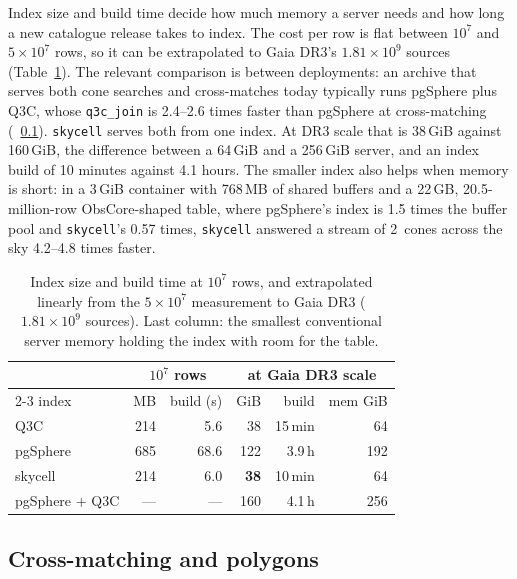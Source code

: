 Index size and build time decide how much memory a server needs and how long a new
catalogue release takes to index. The cost per row is flat between $10^7$ and $5\times10^7$ rows, so it can be
extrapolated to Gaia DR3's $1.81\times10^9$ sources (Table~\ref{tab:gaia}). The
relevant comparison is between deployments: an archive that serves both cone searches
and cross-matches today typically runs pgSphere plus Q3C, whose \texttt{q3c\_join} is
2.4--2.6 times faster than pgSphere at cross-matching (\Sect~\ref{sec:xmatch}).
\texttt{skycell} serves both from one index. At DR3 scale that is 38\,GiB against
160\,GiB, the difference between a 64\,GiB and a 256\,GiB server, and an index build of
10 minutes against 4.1 hours. The smaller index also helps when memory is short: in a
3\,GiB container with 768\,MB of shared buffers and a 22\,GB, 20.5-million-row
ObsCore-shaped table, where pgSphere's index is 1.5 times the buffer pool and
\texttt{skycell}'s 0.57 times, \texttt{skycell} answered a stream of 2\degr\ cones
across the sky 4.2--4.8 times faster.

\begin{table}
  \caption{Index size and build time at $10^7$ rows, and extrapolated linearly from the
    $5\times10^7$ measurement to Gaia DR3 ($1.81\times10^9$ sources). Last column: the
    smallest conventional server memory holding the index with room for the table.}
  \label{tab:gaia}
  \centering
  \footnotesize
  \begin{tabular}{@{}l rr rrr@{}}
    \hline\hline
    & \multicolumn{2}{c}{$10^7$ rows} & \multicolumn{3}{c}{at Gaia DR3 scale} \\
    \cline{2-3}\cline{4-6}
    index & MB & build (s) & GiB & build & mem GiB \\
    \hline
    Q3C              & 214 &  5.6 & 38 & 15\,min & 64 \\
    pgSphere         & 685 & 68.6 & 122 & 3.9\,h & 192 \\
    skycell          & 214 &  6.0 & \textbf{38} & 10\,min & 64 \\
    \hline
    pgSphere $+$ Q3C & --- & --- & 160 & 4.1\,h & 256 \\
    \hline
  \end{tabular}
\end{table}

\subsection{Cross-matching and polygons}
\label{sec:xmatch}
\label{sec:otherops}

